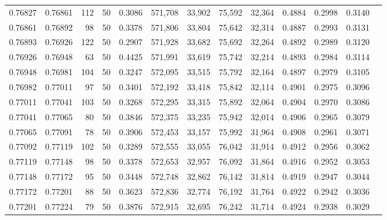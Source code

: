 \begin{tabular}{rrrrrrrrrrrrr}
0.76827 & 0.76861 &   112 &  50 &                                     0.3086 & 571,708 &  33,902 &  75,592 &  32,364 & 0.4884 & 0.2998 & 0.3140 \\
0.76861 & 0.76892 &    98 &  50 &                                     0.3378 & 571,806 &  33,804 &  75,642 &  32,314 & 0.4887 & 0.2993 & 0.3131 \\
0.76893 & 0.76926 &   122 &  50 &                                     0.2907 & 571,928 &  33,682 &  75,692 &  32,264 & 0.4892 & 0.2989 & 0.3120 \\
0.76926 & 0.76948 &    63 &  50 &                                     0.4425 & 571,991 &  33,619 &  75,742 &  32,214 & 0.4893 & 0.2984 & 0.3114 \\
0.76948 & 0.76981 &   104 &  50 &                                     0.3247 & 572,095 &  33,515 &  75,792 &  32,164 & 0.4897 & 0.2979 & 0.3105 \\
0.76982 & 0.77011 &    97 &  50 &                                     0.3401 & 572,192 &  33,418 &  75,842 &  32,114 & 0.4901 & 0.2975 & 0.3096 \\
0.77011 & 0.77041 &   103 &  50 &                                     0.3268 & 572,295 &  33,315 &  75,892 &  32,064 & 0.4904 & 0.2970 & 0.3086 \\
0.77041 & 0.77065 &    80 &  50 &                                     0.3846 & 572,375 &  33,235 &  75,942 &  32,014 & 0.4906 & 0.2965 & 0.3079 \\
0.77065 & 0.77091 &    78 &  50 &                                     0.3906 & 572,453 &  33,157 &  75,992 &  31,964 & 0.4908 & 0.2961 & 0.3071 \\
0.77092 & 0.77119 &   102 &  50 &                                     0.3289 & 572,555 &  33,055 &  76,042 &  31,914 & 0.4912 & 0.2956 & 0.3062 \\
0.77119 & 0.77148 &    98 &  50 &                                     0.3378 & 572,653 &  32,957 &  76,092 &  31,864 & 0.4916 & 0.2952 & 0.3053 \\
0.77148 & 0.77172 &    95 &  50 &                                     0.3448 & 572,748 &  32,862 &  76,142 &  31,814 & 0.4919 & 0.2947 & 0.3044 \\
0.77172 & 0.77201 &    88 &  50 &                                     0.3623 & 572,836 &  32,774 &  76,192 &  31,764 & 0.4922 & 0.2942 & 0.3036 \\
0.77201 & 0.77224 &    79 &  50 &                                     0.3876 & 572,915 &  32,695 &  76,242 &  31,714 & 0.4924 & 0.2938 & 0.3029 \\

\end{tabular}
